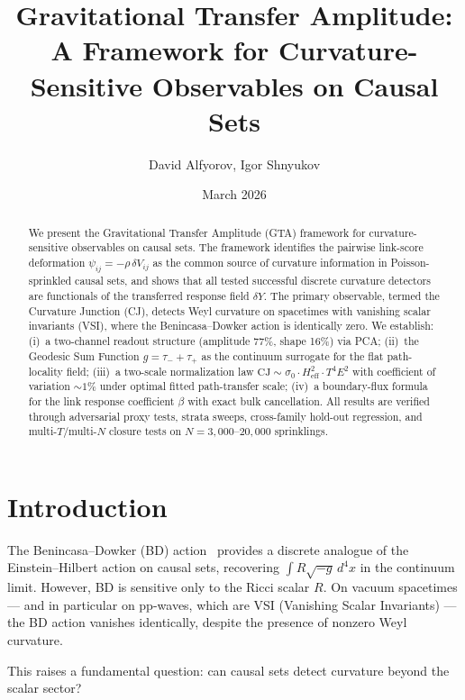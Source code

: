 \documentclass[12pt,a4paper]{article}
\title{Gravitational Transfer Amplitude:\\
A Framework for Curvature-Sensitive Observables on Causal Sets}
\author{David Alfyorov, Igor Shnyukov}
\date{March 2026}
\begin{document}
\maketitle

\begin{abstract}
We present the Gravitational Transfer Amplitude (GTA) framework for curvature-sensitive observables on causal sets.
The framework identifies the pairwise link-score deformation $\psi_{ij} = -\rho\,\delta V_{ij}$ as the common source of curvature information in Poisson-sprinkled causal sets, and shows that all tested successful discrete curvature detectors are functionals of the transferred response field $\delta Y$.
The primary observable, termed the Curvature Junction (CJ), detects Weyl curvature on spacetimes with vanishing scalar invariants (VSI), where the Benincasa--Dowker action is identically zero.
We establish: (i)~a two-channel readout structure (amplitude 77\%, shape 16\%) via PCA;
(ii)~the Geodesic Sum Function $g = \tau_- + \tau_+$ as the continuum surrogate for the flat path-locality field;
(iii)~a two-scale normalization law $\mathrm{CJ} \sim \sigma_0 \cdot H_{\mathrm{eff}}^2 \cdot T^4 E^2$ with coefficient of variation $\sim 1\%$ under optimal fitted path-transfer scale;
(iv)~a boundary-flux formula for the link response coefficient $\beta$ with exact bulk cancellation.
All results are verified through adversarial proxy tests, strata sweeps, cross-family hold-out regression, and multi-$T$/multi-$N$ closure tests on $N = 3{,}000$--$20{,}000$ sprinklings.
\end{abstract}

\tableofcontents

\section{Introduction}

The Benincasa--Dowker (BD) action~\cite{BD2010} provides a discrete analogue of the Einstein--Hilbert action on causal sets, recovering $\int R\sqrt{-g}\,d^4x$ in the continuum limit. However, BD is sensitive only to the Ricci scalar $R$. On vacuum spacetimes --- and in particular on pp-waves, which are VSI (Vanishing Scalar Invariants) --- the BD action vanishes identically, despite the presence of nonzero Weyl curvature.

This raises a fundamental question: can causal sets detect curvature beyond the scalar sector?
\end{document}
